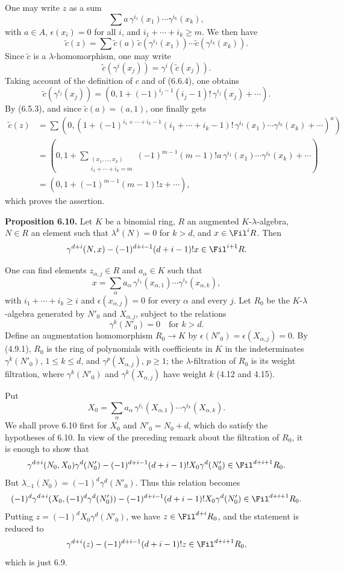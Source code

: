 One may write \(z\) as a sum
\[
  \sum a\,\gamma^{i_1}(x_1)\cdots\gamma^{i_k}(x_k),
\]
with \(a\in A\), \(\epsilon(x_i)=0\) for all \(i\), and \(i_1+\cdots+i_k\ge m\). We then have
\[
  \widetilde c(z)=
  \sum \widetilde c(a)\,
        \widetilde c(\gamma^{i_1}(x_1))\cdots
        \widetilde c(\gamma^{i_k}(x_k)).
\]
Since \(\widetilde c\) is a \(\lambda\)-homomorphism, one may write
\[
  \widetilde c(\gamma^i(x_j))=\gamma^i(\widetilde c(x_j)).
\]
Taking account of the definition of \(c\) and of (6.6.4), one obtains
\[
  \widetilde c(\gamma^{i_j}(x_j))
  =
  \left(0,1+(-1)^{i_j-1}(i_j-1)!\,\gamma^{i_j}(x_j)+\cdots\right).
\]
By (6.5.3), and since \(\widetilde c(a)=(a,1)\), one finally gets
\[
\begin{aligned}
\widetilde c(z)
&=\sum
\left(0,\left(1+
(-1)^{i_1+\cdots+i_k-1}
(i_1+\cdots+i_k-1)!
\,\gamma^{i_1}(x_1)\cdots\gamma^{i_k}(x_k)
+\cdots\right)^a\right)\\
&=
\left(0,1+
\sum_{\substack{(x_1,\ldots,x_k)\\ i_1+\cdots+i_k=m}}
(-1)^{m-1}(m-1)!a\,\gamma^{i_1}(x_1)\cdots\gamma^{i_k}(x_k)
+\cdots\right)\\
&=
(0,1+(-1)^{m-1}(m-1)!z+\cdots),
\end{aligned}
\]
which proves the assertion.

\textbf{Proposition 6.10.} Let \(K\) be a binomial ring, \(R\) an augmented \(K\)-\(\lambda\)-algebra, \(N\in R\) an element such that \(\lambda^k(N)=0\) for \(k>d\), and \(x\in\Fil^iR\). Then
\[
  \gamma^{d+i}(N,x)-(-1)^{d+i-1}(d+i-1)!x\in\Fil^{i+1}R.
\]

One can find elements \(z_{\alpha,j}\in R\) and \(a_\alpha\in K\) such that
\[
  x=\sum_\alpha a_\alpha\,
       \gamma^{i_1}(x_{\alpha,1})\cdots
       \gamma^{i_k}(x_{\alpha,k}),
\]
with \(i_1+\cdots+i_k\ge i\) and \(\epsilon(x_{\alpha,j})=0\) for every \(\alpha\) and every \(j\). Let \(R_0\) be the \(K\)-\(\lambda\)-algebra generated by \(N'_0\) and \(X_{\alpha,j}\), subject to the relations
\[
  \gamma^k(N'_0)=0\quad\text{for }k>d.
\]
Define an augmentation homomorphism \(R_0\to K\) by \(\epsilon(N'_0)=\epsilon(X_{\alpha,j})=0\). By (4.9.1), \(R_0\) is the ring of polynomials with coefficients in \(K\) in the indeterminates \(\gamma^k(N'_0)\), \(1\le k\le d\), and \(\gamma^p(X_{\alpha,j})\), \(p\ge1\); the \(\lambda\)-filtration of \(R_0\) is its weight filtration, where \(\gamma^k(N'_0)\) and \(\gamma^k(X_{\alpha,j})\) have weight \(k\) (4.12 and 4.15).

Put
\[
  X_0=\sum_\alpha a_\alpha\,
       \gamma^{i_1}(X_{\alpha,1})\cdots
       \gamma^{i_k}(X_{\alpha,k}).
\]
We shall prove 6.10 first for \(X_0\) and \(N'_0=N_0+d\), which do satisfy the hypotheses of 6.10. In view of the preceding remark about the filtration of \(R_0\), it is enough to show that
\[
  \gamma^{d+i}(N_0,X_0)\gamma^d(N'_0)
  -
  (-1)^{d+i-1}(d+i-1)!X_0\gamma^d(N'_0)
  \in\Fil^{d+i+1}R_0 .
\]
But \(\lambda_{-1}(N_0)=(-1)^d\gamma^d(N'_0)\). Thus this relation becomes
\[
  (-1)^d\gamma^{d+i}(X_0,(-1)^d\gamma^d(N'_0))
  -
  (-1)^{d+i-1}(d+i-1)!X_0\gamma^d(N'_0)
  \in\Fil^{d+i+1}R_0 .
\]
Putting \(z=(-1)^dX_0\gamma^d(N'_0)\), we have \(z\in\Fil^{d+i}R_0\), and the statement is reduced to
\[
  \gamma^{d+i}(z)-(-1)^{d+i-1}(d+i-1)!z\in\Fil^{d+i+1}R_0,
\]
which is just 6.9.

